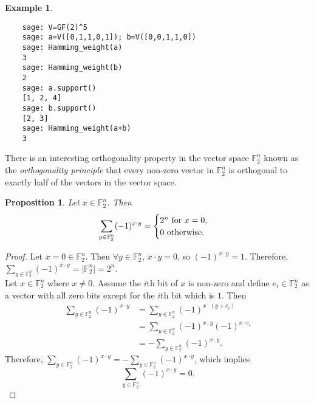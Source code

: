 \documentclass[english]{article}
\def\gftwo{\mathbb{F}_2}
\theoremstyle{plain}
\newtheorem{proposition}[theorem]{Proposition}%
\theoremstyle{definition}
\newtheorem{example}[theorem]{Example}
\theoremstyle{remark}
\begin{document}
\begin{example}
  \ 
  \begin{lstlisting}
    sage: V=GF(2)^5
    sage: a=V([0,1,1,0,1]); b=V([0,0,1,1,0])
    sage: Hamming_weight(a)
    3
    sage: Hamming_weight(b)
    2
    sage: a.support()
    [1, 2, 4]
    sage: b.support()
    [2, 3]
    sage: Hamming_weight(a+b)
    3
  \end{lstlisting}

\end{example}

\par There is an interesting orthogonality property in the vector space
$\gftwo^n$ known as the {\em orthogonality principle} that every non-zero
vector in $\gftwo^n$ is orthogonal to exactly half of the vectors in the
vector space.

\begin{proposition}
\label{prop:orthogonality-principle}
  Let $x\in\gftwo^n$. Then
  \begin{equation*}
    \sum_{y\in\gftwo^n}(-1)^{x\cdot y}=
    \begin{cases}
      2^n \text{ \rm for } x=0, \\
      0 \text{ \rm otherwise.}
    \end{cases}
  \end{equation*}
\end{proposition}

\begin{proof}
  Let $x=0\in\gftwo^n$. Then $\forall y\in\gftwo^n$, $x\cdot y=0$, so
  $(-1)^{x\cdot y}=1$. Therefore, $\sum_{y\in\gftwo^n}(-1)^{x\cdot y}=
  \allowbreak\lvert\gftwo^n\rvert=\allowbreak 2^n$. \\

  Let $x\in\gftwo^n$ where $x\not=0$. Assume the $i$th bit of $x$ is
  non-zero and define $e_i\in\gftwo^n$ as a vector with all zero bits
  except for the $i$th bit which is $1$. Then
  \begin{align*}
    \sum_{y\in\gftwo^n}(-1)^{x\cdot y}
      &= \sum_{y\in\gftwo^n}(-1)^{x\cdot (y+e_i)} \\
      &= \sum_{y\in\gftwo^n}(-1)^{x\cdot y}(-1)^{x\cdot e_i} \\
      &= -\sum_{y\in\gftwo^n}(-1)^{x\cdot y}.
  \end{align*}
  Therefore, $\sum_{y\in\gftwo^n}(-1)^{x\cdot y}=\allowbreak
  -\sum_{y\in\gftwo^n}(-1)^{x\cdot y}$, which implies
  \[
  \sum_{y\in\gftwo^n}(-1)^{x\cdot y}=0.
  \]
\end{proof}
\end{document}
